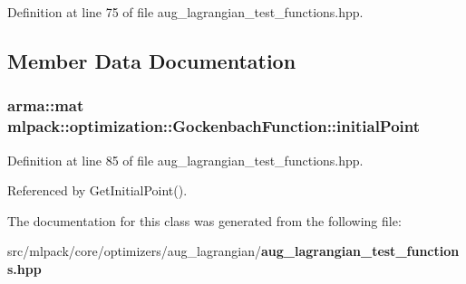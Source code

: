 Definition at line 75 of file aug\-\_\-lagrangian\-\_\-test\-\_\-functions.\-hpp.



\subsection{Member Data Documentation}
\subsubsection[{initial\-Point}]{\setlength{\rightskip}{0pt plus 5cm}arma\-::mat mlpack\-::optimization\-::\-Gockenbach\-Function\-::initial\-Point\hspace{0.3cm}{\ttfamily [private]}}\label{classmlpack_1_1optimization_1_1GockenbachFunction_a244c71dbc7aae79eb991f84ced05f326}


Definition at line 85 of file aug\-\_\-lagrangian\-\_\-test\-\_\-functions.\-hpp.



Referenced by Get\-Initial\-Point().



The documentation for this class was generated from the following file\-:\begin{DoxyCompactItemize}
\item 
src/mlpack/core/optimizers/aug\-\_\-lagrangian/{\bf aug\-\_\-lagrangian\-\_\-test\-\_\-functions.\-hpp}\end{DoxyCompactItemize}
